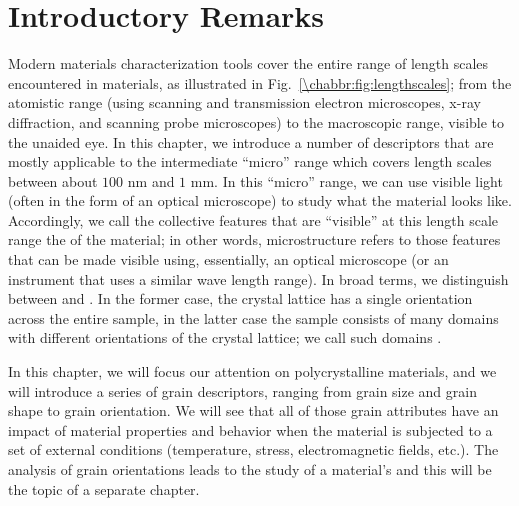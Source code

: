 \section{Introductory Remarks}\label{\chabbr:sec:whatisit}
Modern materials characterization tools cover the entire range of length scales encountered in materials, as illustrated in Fig.~\ref{\chabbr:fig:lengthscales}; from the atomistic range (using scanning and transmission electron microscopes, x-ray diffraction, and scanning probe microscopes) to the macroscopic range, visible to the unaided eye.  In this chapter, we introduce a number of descriptors that are mostly applicable to the intermediate ``micro'' range which covers length scales between about $100$ nm and $1$ mm.  In this ``micro'' range, we can use visible light (often in the form of an optical microscope) to study what the material looks like. Accordingly, we call the collective features that are ``visible'' at this length scale range the  of the material; in other words, microstructure refers to those features that can be made visible using, essentially, an optical microscope (or an instrument that uses a similar wave length range).   In broad terms, we distinguish between  and . In the former case, the crystal lattice has a single orientation across the entire sample, in the latter case the sample consists of many domains with different orientations of the crystal lattice; we call such domains . 

In this chapter, we will focus our attention on polycrystalline materials, and we will introduce a series of grain descriptors, ranging from grain size and grain shape to grain orientation.  We will see that all of those grain attributes have an impact of material properties and behavior when the material is subjected to a set of external conditions (temperature, stress, electromagnetic fields, etc.). The analysis of grain orientations leads to the study of a material's  and this will be the topic of a separate chapter.

